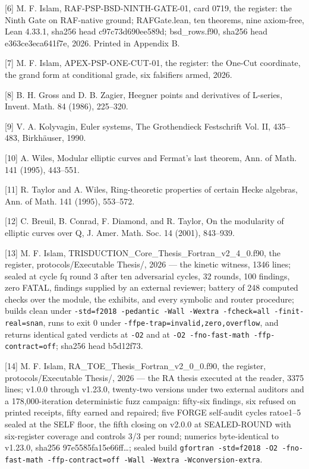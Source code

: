 \documentclass[10pt,twocolumn]{article}
\begin{document}
{[}6{]} M. F. Islam, RAF-PSP-BSD-NINTH-GATE-01, card 0719, the register:
the Ninth Gate on RAF-native ground; RAFGate.lean, ten theorems, nine
axiom-free, Lean 4.33.1, sha256 head c97c73d690ee589d; bsd\_rows.f90,
sha256 head e363ce3eca641f7e, 2026. Printed in Appendix B.

{[}7{]} M. F. Islam, APEX-PSP-ONE-CUT-01, the register: the One-Cut
coordinate, the grand form at conditional grade, six falsifiers armed,
2026.

{[}8{]} B. H. Gross and D. B. Zagier, Heegner points and derivatives of
L-series, Invent. Math. 84 (1986), 225--320.

{[}9{]} V. A. Kolyvagin, Euler systems, The Grothendieck Festschrift
Vol. II, 435--483, Birkhäuser, 1990.

{[}10{]} A. Wiles, Modular elliptic curves and Fermat's last theorem,
Ann. of Math. 141 (1995), 443--551.

{[}11{]} R. Taylor and A. Wiles, Ring-theoretic properties of certain
Hecke algebras, Ann. of Math. 141 (1995), 553--572.

{[}12{]} C. Breuil, B. Conrad, F. Diamond, and R. Taylor, On the
modularity of elliptic curves over Q, J. Amer. Math. Soc. 14 (2001),
843--939.

{[}13{]} M. F. Islam, TRISDUCTION\_Core\_Thesis\_Fortran\_v2\_4\_0.f90,
the register, protocols/Executable Thesis/, 2026 --- the kinetic
witness, 1346 lines; sealed at cycle fq round 3 after ten adversarial
cycles, 32 rounds, 100 findings, zero FATAL, findings supplied by an
external reviewer; battery of 248 computed checks over the module, the
exhibits, and every symbolic and router procedure; builds clean under
\texttt{-std=f2018\ -pedantic\ -Wall\ -Wextra\ -fcheck=all\ -finit-real=snan},
runs to exit 0 under \texttt{-ffpe-trap=invalid,zero,overflow}, and
returns identical gated verdicts at \texttt{-O2} and at
\texttt{-O2\ -fno-fast-math\ -ffp-contract=off}; sha256 head b5d12f73.

{[}14{]} M. F. Islam, RA\_TOE\_Thesis\_Fortran\_v2\_0\_0.f90, the
register, protocols/Executable Thesis/, 2026 --- the RA thesis executed
at the reader, 3375 lines; v1.0.0 through v1.23.0, twenty-two versions
under two external auditors and a 178,000-iteration deterministic fuzz
campaign: fifty-six findings, six refused on printed receipts, fifty
earned and repaired; five FORGE self-audit cycles ratoe1--5 sealed at
the SELF floor, the fifth closing on v2.0.0 at SEALED-ROUND with
six-register coverage and controls 3/3 per round; numerics
byte-identical to v1.23.0, sha256 97e5585fa15e66ff\ldots; sealed build
\texttt{gfortran\ -std=f2018\ -O2\ -fno-fast-math\ -ffp-contract=off\ -Wall\ -Wextra\ -Wconversion-extra}.
\end{document}
